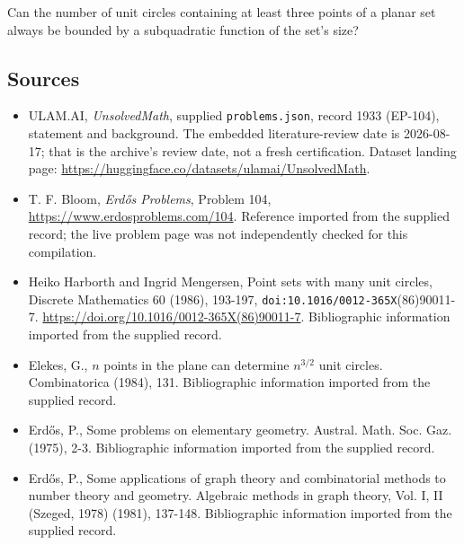 \documentclass[11pt,a4paper]{article}
\begin{document}
Can the number of unit circles containing at least three points of a planar set always be bounded by a subquadratic function of the set's size?

\subsection{Sources}

{\small

\begin{itemize}

\item[\hypertarget{source:1933:1}{S1}] ULAM.AI, \emph{UnsolvedMath}, supplied \texttt{problems.json}, record 1933 (EP-104), statement and background. The embedded literature-review date is 2026-08-17; that is the archive’s review date, not a fresh certification. Dataset landing page: \url{https://huggingface.co/datasets/ulamai/UnsolvedMath}.

\item[\hypertarget{source:1933:2}{S2}] T. F. Bloom, \emph{Erdős Problems}, Problem 104, \url{https://www.erdosproblems.com/104}. Reference imported from the supplied record; the live problem page was not independently checked for this compilation.

\item[\hypertarget{source:1933:3}{S3}] Heiko Harborth and Ingrid Mengersen, Point sets with many unit circles, Discrete Mathematics 60 (1986), 193-197, \nolinkurl{doi:10.1016/0012-365X}(86)90011-7. \url{https://doi.org/10.1016/0012-365X(86)90011-7}. Bibliographic information imported from the supplied record.

\item[\hypertarget{source:1933:4}{S4}] Elekes, G., {$n$} points in the plane can determine $n^{3/2}$ unit circles. Combinatorica (1984), 131. Bibliographic information imported from the supplied record.

\item[\hypertarget{source:1933:5}{S5}] Erd\H{o}s, P., Some problems on elementary geometry. Austral. Math. Soc. Gaz. (1975), 2-3. Bibliographic information imported from the supplied record.

\item[\hypertarget{source:1933:6}{S6}] Erd\H{o}s, P., Some applications of graph theory and combinatorial methods to number theory and geometry. Algebraic methods in graph theory, Vol. I, II (Szeged, 1978) (1981), 137-148. Bibliographic information imported from the supplied record.

\end{itemize}

}

\label{end:1933}
\end{document}
